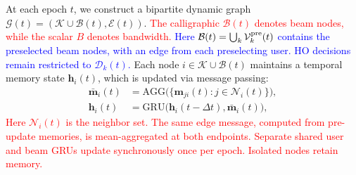 \documentclass[10pt,letterpaper,journal]{IEEEtran}
\newcommand{\revnew}[1]{\textcolor{red}{#1}}
\begin{document}
At each epoch $t$, we construct a bipartite dynamic graph
$\mathcal{G}(t)=(\mathcal{K}\cup\mathcal{B}(t),\mathcal{E}(t))$.
\revnew{The calligraphic $\mathcal B(t)$ denotes beam nodes, while the scalar $B$ denotes bandwidth.}
\textcolor{blue}{Here $\mathcal B(t)=\bigcup_k\mathcal V_k^{\rm pre}(t)$ contains the preselected beam nodes, with an edge from each preselecting user. HO decisions remain restricted to $\mathcal D_k(t)$.}
Each node $i\in\mathcal{K}\cup\mathcal{B}(t)$ maintains a temporal memory state $\mathbf{h}_i(t)$, which is updated via message passing:
\begin{align}
\bar{\mathbf{m}}_i(t) &=
\mathrm{AGG}\Big(\{\mathbf{m}_{ji}(t): j\in \mathcal{N}_i(t)\}\Big),
\label{eq:agg_main}\\
\mathbf{h}_i(t) &= \mathrm{GRU}\big(\mathbf{h}_i(t-\Delta t),\bar{\mathbf{m}}_i(t)\big),
\label{eq:gru_main}
\end{align}
\revnew{Here $\mathcal N_i(t)$ is the neighbor set. The same edge message, computed from pre-update memories, is mean-aggregated at both endpoints. Separate shared user and beam GRUs update synchronously once per epoch. Isolated nodes retain memory.}
\end{document}

